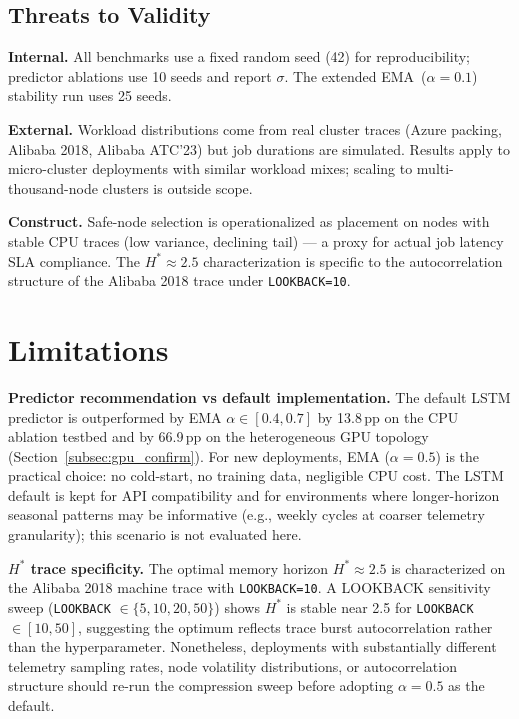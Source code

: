 \documentclass[conference]{IEEEtran}
\begin{document}
\subsection{Threats to Validity}

\textbf{Internal.} All benchmarks use a fixed random seed (42) for
reproducibility; predictor ablations use 10 seeds and report $\sigma$.
The extended EMA~($\alpha{=}0.1$) stability run uses 25 seeds.

\textbf{External.} Workload distributions come from real cluster traces
(Azure packing, Alibaba 2018, Alibaba ATC'23) but job durations are
simulated. Results apply to micro-cluster deployments with similar workload
mixes; scaling to multi-thousand-node clusters is outside scope.

\textbf{Construct.} Safe-node selection is operationalized as placement on
nodes with stable CPU traces (low variance, declining tail) --- a proxy for
actual job latency SLA compliance. The $H^{*}{\approx}2.5$ characterization
is specific to the autocorrelation structure of the Alibaba 2018 trace
under \texttt{LOOKBACK=10}.


\section{Limitations}
\label{sec:limitations}

\textbf{Predictor recommendation vs default implementation.}
The default LSTM predictor is outperformed by EMA $\alpha \in [0.4, 0.7]$
by 13.8\,pp on the CPU ablation testbed and by 66.9\,pp on the
heterogeneous GPU topology (Section~\ref{subsec:gpu_confirm}). For new
deployments, EMA ($\alpha{=}0.5$) is the practical choice: no cold-start,
no training data, negligible CPU cost. The LSTM default is kept for API
compatibility and for environments where longer-horizon seasonal patterns
may be informative (e.g., weekly cycles at coarser telemetry granularity);
this scenario is not evaluated here.

\textbf{$H^{*}$ trace specificity.} The optimal memory horizon
$H^{*}{\approx}2.5$ is characterized on the Alibaba 2018 machine trace
with \texttt{LOOKBACK=10}. A LOOKBACK sensitivity sweep
(\texttt{LOOKBACK} $\in \{5,10,20,50\}$) shows $H^*$ is stable near 2.5
for \texttt{LOOKBACK} $\in [10,50]$, suggesting the optimum reflects
trace burst autocorrelation rather than the hyperparameter. Nonetheless,
deployments with substantially different telemetry sampling rates, node
volatility distributions, or autocorrelation structure should re-run the
compression sweep before adopting $\alpha{=}0.5$ as the default.
\end{document}
